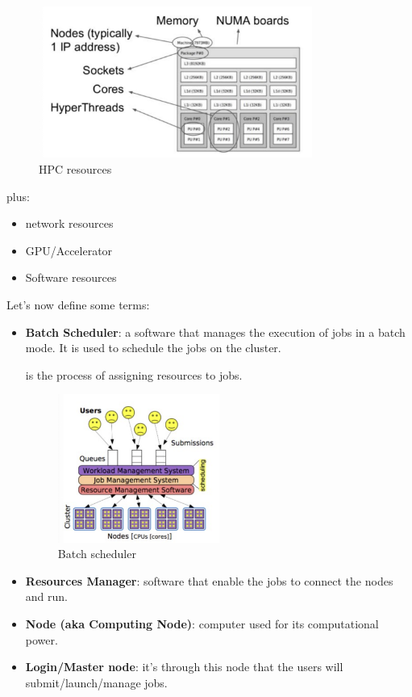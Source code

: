 \begin{figure}[H]
    \centering
    \includegraphics[width=0.8\textwidth]{assets/fig14.png}
    \caption{HPC resources}
    \label{fig:hpc_resources}
\end{figure}

plus:
\begin{itemize}
    \item network resources 
    \item GPU/Accelerator 
    \item Software resources 
\end{itemize}

Let's now define some terms:
\begin{itemize}
    \item \textbf{Batch Scheduler}: a software that manages the execution of jobs in a batch mode. It is used to schedule the jobs on the cluster.
    \begin{observationblock}[Scheduling]
         is the process of assigning resources to jobs.
    \end{observationblock}
    \begin{figure}[H]
        \centering
        \includegraphics[width=0.5\textwidth]{assets/fig15.png}
        \caption{Batch scheduler}
        \label{fig:scheduling}
    \end{figure}
    \item \textbf{Resources Manager}: software that enable the jobs to connect the nodes and run. 
    \item \textbf{Node (aka Computing Node)}: computer used for its computational power.
    \item \textbf{Login/Master node}: it's through this node that the users will submit/launch/manage jobs.
\end{itemize}


